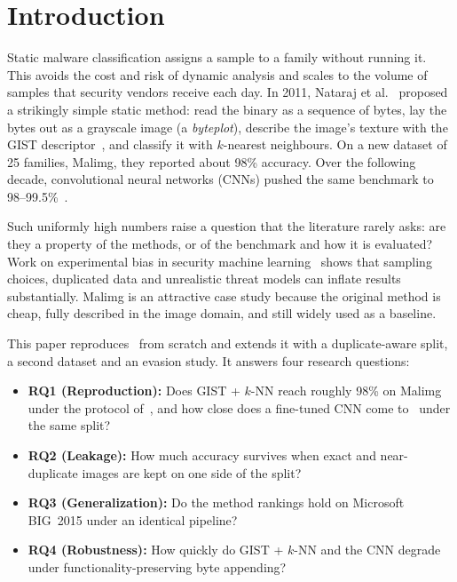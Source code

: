\documentclass[conference]{IEEEtran}
\begin{document}
\section{Introduction}
Static malware classification assigns a sample to a family without running it. This
avoids the cost and risk of dynamic analysis and scales to the volume of samples that
security vendors receive each day. In 2011, Nataraj et al.~\cite{nataraj2011images}
proposed a strikingly simple static method: read the binary as a sequence of bytes,
lay the bytes out as a grayscale image (a \emph{byteplot}), describe the image's
texture with the GIST descriptor~\cite{oliva2001gist}, and classify it with $k$-nearest
neighbours. On a new dataset of 25 families, Malimg, they reported about 98\%
accuracy. Over the following decade, convolutional neural networks (CNNs) pushed the
same benchmark to 98--99.5\%~\cite{kalash2018mcnn,gibert2019cnn,vasan2020imcfn,vasan2020imcec}.

Such uniformly high numbers raise a question that the literature rarely asks: are
they a property of the methods, or of the benchmark and how it is evaluated? Work on
experimental bias in security machine learning~\cite{pendlebury2019tesseract,arp2022dos}
shows that sampling choices, duplicated data and unrealistic threat models can
inflate results substantially. Malimg is an attractive case study because the
original method is cheap, fully described in the image domain, and still widely used
as a baseline.

This paper reproduces~\cite{nataraj2011images} from scratch and extends it with a
duplicate-aware split, a second dataset and an evasion study. It answers four
research questions:

\begin{itemize}
  \item \textbf{RQ1 (Reproduction):} Does GIST + $k$-NN reach roughly 98\% on Malimg under the protocol of~\cite{nataraj2011images}, and how close does a fine-tuned CNN come to~\cite{kalash2018mcnn,vasan2020imcfn} under the same split?
  \item \textbf{RQ2 (Leakage):} How much accuracy survives when exact and near-duplicate images are kept on one side of the split?
  \item \textbf{RQ3 (Generalization):} Do the method rankings hold on Microsoft BIG~2015 under an identical pipeline?
  \item \textbf{RQ4 (Robustness):} How quickly do GIST + $k$-NN and the CNN degrade under functionality-preserving byte appending?
\end{itemize}
\end{document}

